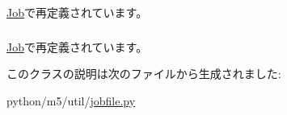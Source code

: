 \hyperlink{classm5_1_1util_1_1jobfile_1_1Job_aafc566bb08a9f46485e7238669581c2b}{Job}で再定義されています。\hypertarget{classm5_1_1util_1_1jobfile_1_1Data_ab74e6bf80237ddc4109968cedc58c151}{
\subsubsection[{name}]{}}
\label{classm5_1_1util_1_1jobfile_1_1Data_ab74e6bf80237ddc4109968cedc58c151}


\hyperlink{classm5_1_1util_1_1jobfile_1_1Job_ab74e6bf80237ddc4109968cedc58c151}{Job}で再定義されています。

このクラスの説明は次のファイルから生成されました:\begin{DoxyCompactItemize}
\item 
python/m5/util/\hyperlink{jobfile_8py}{jobfile.py}\end{DoxyCompactItemize}
